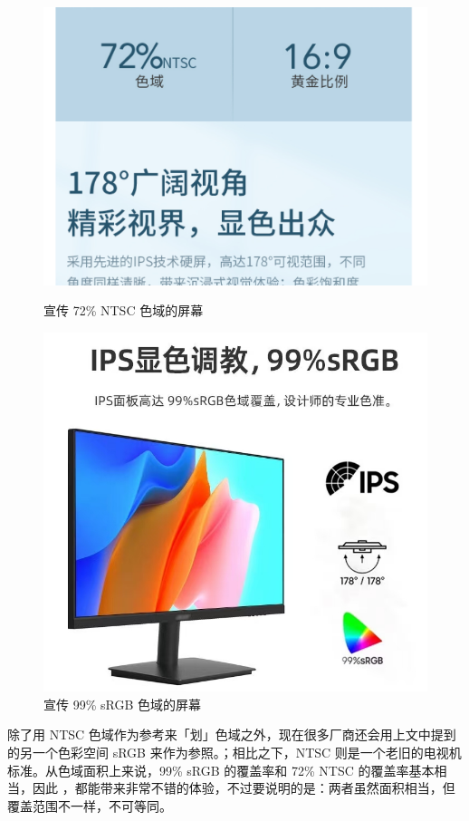 \begin{figure}[htb!]
  \begin{minipage}{.49\textwidth}
    \centering
    \includegraphics[width=.8\textwidth]{assets/advanced/NTSC_72_ad.png}
    \caption{宣传 72\% NTSC 色域的屏幕}
    \label{fig:NTSC_72_ad}
  \end{minipage}
  \quad
  \begin{minipage}{.49\textwidth}
    \centering
    \includegraphics[width=.7\textwidth]{assets/advanced/SRGB_99_ad.png}
    \caption{宣传 99\% sRGB 色域的屏幕}
    \label{fig:SRGB_99_ad}
  \end{minipage}
\end{figure}

除了用 NTSC 色域作为参考来「划」色域之外，现在很多厂商还会用上文中提到的另一个色彩空间 sRGB 来作为参照。；相比之下，NTSC 则是一个老旧的电视机标准。从色域面积上来说，99\% sRGB 的覆盖率和 72\% NTSC 的覆盖率基本相当，因此 ，都能带来非常不错的体验，不过要说明的是：两者虽然面积相当，但覆盖范围不一样，不可等同。

